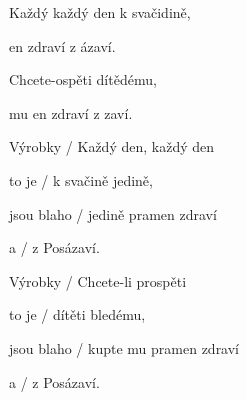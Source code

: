 

\zs
Každý  každý den k svačidině,

 en zdraví z ázaví. 

Chcete-ospěti dítědému,

 mu en zdraví z zaví. 
\ks

\zr
Výrobky  / Každý den, každý den

to je  / k svačině jedině,

jsou blaho  / jedině pramen zdraví

a   / z Posázaví.

Výrobky  / Chcete-li prospěti

to je  / dítěti bledému,

jsou blaho  / kupte mu pramen zdraví

a   / z Posázaví.

\kr

\zr \kr
\kp


















